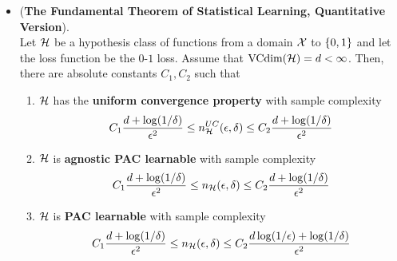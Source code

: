 \documentclass[11pt]{article}
\begin{document}
\begin{itemize}
\item \begin{theorem} (\textbf{The Fundamental Theorem of Statistical Learning, Quantitative Version}). \citep{shalev2014understanding}\\
Let ${\mathcal H}$ be a hypothesis class of functions from a domain ${\mathcal X}$ to $\left\{0,1\right\}$ and let the loss function be the $0$-$1$ loss. Assume that $\text{VCdim}({\mathcal H}) = d < \infty$. Then, there are absolute constants $C_1, C_2$ such that
\begin{enumerate}
\item ${\mathcal H}$ has the \textbf{uniform convergence property} with sample complexity
\begin{align*}
C_1\frac{d + \log(1/\delta)}{\epsilon^2} \le n^{UC}_{{\mathcal H}}(\epsilon, \delta) \le C_2\frac{d + \log(1/\delta)}{\epsilon^2}
\end{align*}
\item ${\mathcal H}$ is \textbf{agnostic PAC learnable} with sample complexity
\begin{align*}
C_1\frac{d + \log(1/\delta)}{\epsilon^2} \le n_{{\mathcal H}}(\epsilon, \delta) \le C_2\frac{d + \log(1/\delta)}{\epsilon^2}
\end{align*}
\item ${\mathcal H}$ is \textbf{PAC learnable} with sample complexity
\begin{align*}
C_1\frac{d + \log(1/\delta)}{\epsilon^2} \le n_{{\mathcal H}}(\epsilon, \delta) \le C_2\frac{d\log(1/\epsilon) + \log(1/\delta)}{\epsilon^2}
\end{align*}
\end{enumerate}
\end{theorem}
\end{itemize}
\newpage


\end{document}
